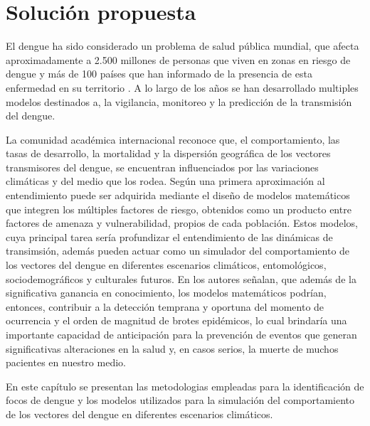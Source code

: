 \chapter{Solución propuesta}

El dengue ha sido considerado un problema de salud pública mundial, que afecta aproximadamente a
2.500 millones de personas que viven en zonas en riesgo de dengue y más de 100 países que han
informado de la presencia de esta enfermedad en su territorio \citet{gustavo2006dengue}. A lo
largo de los años se han desarrollado multiples modelos destinados a, la vigilancia, monitoreo y
la predicción de la transmisión del dengue.

La comunidad académica internacional reconoce que, el comportamiento, las tasas de desarrollo, la
mortalidad y la dispersión geográfica de los vectores transmisores del dengue, se encuentran
influenciados por las variaciones climáticas y del medio que los rodea. Según
\citet{velez2013hacia} una primera aproximación al entendimiento puede ser adquirida mediante el
diseño de modelos matemáticos que integren los múltiples factores de riesgo, obtenidos como un
producto entre factores de amenaza y vulnerabilidad, propios de cada población. Estos modelos,
cuya principal tarea sería profundizar el entendimiento de las dinámicas de transimsión, además
pueden actuar como un simulador del comportamiento de los vectores del dengue en diferentes
escenarios climáticos, entomológicos, sociodemográficos y culturales futuros. En
\citet{velez2013hacia} los autores señalan, que además de la significativa ganancia en
conocimiento, los modelos matemáticos podrían, entonces, contribuir a la detección temprana y
oportuna del momento de ocurrencia y el orden de magnitud de brotes epidémicos, lo cual brindaría
una importante capacidad de anticipación para la prevención de eventos que generan significativas
alteraciones en la salud y, en casos serios, la muerte de muchos pacientes en nuestro medio.

En este capítulo se presentan las metodologias empleadas para la identificación de focos de dengue
y los modelos utilizados para la simulación del comportamiento de los vectores del dengue en
diferentes escenarios climáticos.







